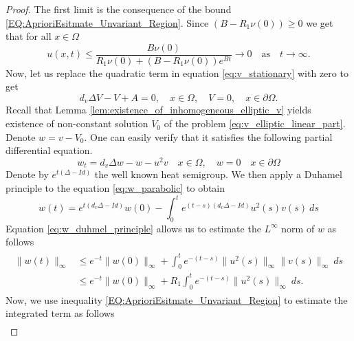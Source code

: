 \documentclass[12pt, a4paper]{article}
\theoremstyle{break}
\theoremstyle{break}
\theoremstyle{break}
\theoremstyle{break}
\theoremstyle{break}
\theoremstyle{break}
\theoremstyle{break}
\begin{document}
\begin{proof}
    The first limit is the consequence of the bound \eqref{EQ:AprioriEsitmate_Unvariant_Region}. Since $(B - R_1\nu(0)) \geq 0$ we get that for all $x \in \Omega$
    \begin{equation*}
        u(x,t) \leq \frac{B\nu(0)}{R_1 \nu(0) + 
        (B - R_1 \nu(0)) e^{B t}} \rightarrow 0 \quad \text{as} \quad t \rightarrow \infty.
    \end{equation*}
    Now, let us replace the quadratic term in equation \eqref{eq:v_stationary} with zero to get
    \begin{equation}
        \label{eq:v_elliptic_linear_part}
        d_v \Delta V - V + A = 0, \quad x \in \Omega, \quad V = 0, \quad x \in \partial \Omega.
    \end{equation}
    Recall that Lemma \ref{lem:existence_of_inhomogeneous_elliptic_v} yields existence of non-constant solution $V_0$ of the problem \eqref{eq:v_elliptic_linear_part}. Denote $w = v - V_0$. One can easily verify that it satisfies the following partial differential equation.
    \begin{equation}
        \label{eq:w_parabolic}
        w_t = d_v\Delta w - w - u^2v \quad x \in \Omega, \quad w = 0 \quad x \in \partial\Omega
    \end{equation}
    Denote by $e^{t(\Delta - Id)}$ the well known heat semigroup. We then apply a Duhamel principle to the equation \eqref{eq:w_parabolic} to obtain
    \begin{equation}
        \label{eq:w_duhmel_principle}
        w(t) = e^{t(d_v\Delta - Id)} w(0) - \int_0^t e^{(t-s)(d_v\Delta - Id)} u^2(s) v(s)\:ds
    \end{equation}
    Equation \eqref{eq:w_duhmel_principle} allows us to estimate the $L^\infty$ norm of $w$ as follows
    \begin{align}
        \label{eq:w_infty_estimate}
        \begin{split}
            \|w(t)\|_\infty 
            &\leq e^{-t}\|w(0)\|_\infty + \int_0^t e^{-(t-s)} \|u^2(s)\|_\infty \|v(s)\|_\infty\:ds \\
            &\leq e^{-t}\|w(0)\|_\infty + R_1\int_0^t e^{-(t-s)} \|u^2(s)\|_\infty \:ds.
        \end{split}
    \end{align}
    Now, we use inequality \eqref{EQ:AprioriEsitmate_Unvariant_Region} to estimate the integrated term as follows
    \begin{align}
        \label{eq:w_infty_estimate_integral}

\end{align}
\end{proof}
\end{document}
